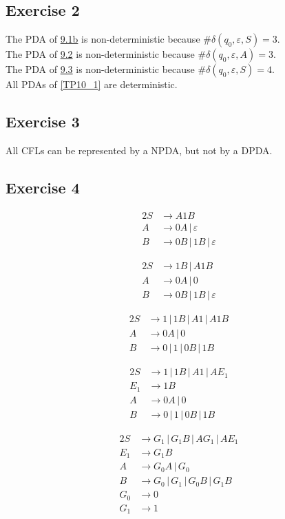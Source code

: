 {\subsection{Exercise 2}
The PDA of \hyperref[TP09_1b]{9.1b} is non-deterministic because $\#\delta(q_0,\varepsilon,S)=3$.\\
The PDA of \hyperref[TP09_2]{9.2} is non-deterministic because $\#\delta(q_0,\varepsilon,A)=3$.\\
The PDA of \hyperref[TP09_3]{9.3} is non-deterministic because $\#\delta (q_0,\varepsilon, S)=4$.\\
All PDAs of \ref{TP10_1} are deterministic.
\subsection{Exercise 3}
All CFLs can be represented by a NPDA, but not by a DPDA.
\subsection{Exercise 4}
\begin{minipage}[c]{0.25\textwidth} \begin{alignat*}{2}
	S &\rightarrow A1B \\
	A &\rightarrow 0A\,|\,\varepsilon\\
	B &\rightarrow 0B\,|\,1B\,|\,\varepsilon
\end{alignat*} \end{minipage}%
\begin{minipage}[c]{0.25\textwidth} \begin{alignat*}{2}
	S &\rightarrow 1B\,|\,A1B \\
	A &\rightarrow 0A\,|\,0\\
	B &\rightarrow 0B\,|\,1B\,|\,\varepsilon
\end{alignat*} \end{minipage}%
\begin{minipage}[c]{0.25\textwidth} \begin{alignat*}{2}
	S &\rightarrow 1\,|\,1B\,|\,A1\,|\,A1B \\
	A &\rightarrow 0A\,|\,0\\
	B &\rightarrow 0\,|\,1\,|\,0B\,|\,1B
\end{alignat*} \end{minipage}%
\begin{minipage}[c]{0.25\textwidth} \begin{alignat*}{2}
	S &\rightarrow 1\,|\,1B\,|\,A1\,|\,AE_1 \\
	E_1 &\rightarrow 1B\\
	A &\rightarrow 0A\,|\,0\\
	B &\rightarrow 0\,|\,1\,|\,0B\,|\,1B
\end{alignat*} \end{minipage}
\begin{alignat*}{2}
	S &\rightarrow G_1\,|\,G_1B\,|\,AG_1\,|\,AE_1 \\
	E_1 &\rightarrow G_1B\\
	A &\rightarrow G_0A\,|\,G_0\\
	B &\rightarrow G_0\,|\,G_1\,|\,G_0B\,|\,G_1B\\
	G_0 &\rightarrow 0\\
	G_1 &\rightarrow 1
\end{alignat*}
}
